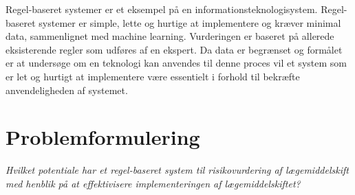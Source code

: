 Regel-baseret systemer er et eksempel på en informationsteknologisystem. Regel-baseret systemer er simple, lette og hurtige at implementere og kræver minimal data, sammenlignet med machine learning. Vurderingen er baseret på allerede eksisterende regler som udføres af en ekspert. Da data er begrænset og formålet er at undersøge om en teknologi kan anvendes til denne proces vil et system som er let og hurtigt at implementere være essentielt i forhold til bekræfte anvendeligheden af systemet. 





\section{Problemformulering}



\textit{Hvilket potentiale har et regel-baseret system til risikovurdering af lægemiddelskift med henblik på at effektivisere implementeringen af lægemiddelskiftet?}

